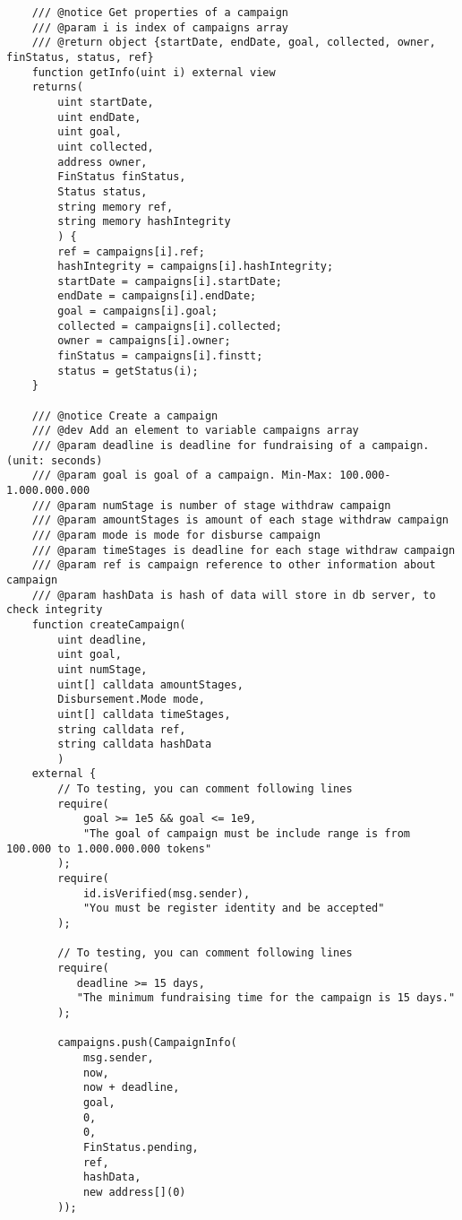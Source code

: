 \documentclass[../main-report.tex]{subfiles}
\begin{document}
\begin{lstlisting}
    /// @notice Get properties of a campaign
    /// @param i is index of campaigns array
    /// @return object {startDate, endDate, goal, collected, owner, finStatus, status, ref}
    function getInfo(uint i) external view
    returns(
        uint startDate,
        uint endDate,
        uint goal,
        uint collected,
        address owner,
        FinStatus finStatus,
        Status status,
        string memory ref,
        string memory hashIntegrity
        ) {
        ref = campaigns[i].ref;
        hashIntegrity = campaigns[i].hashIntegrity;
        startDate = campaigns[i].startDate;
        endDate = campaigns[i].endDate;
        goal = campaigns[i].goal;
        collected = campaigns[i].collected;
        owner = campaigns[i].owner;
        finStatus = campaigns[i].finstt;
        status = getStatus(i);
    }

    /// @notice Create a campaign
    /// @dev Add an element to variable campaigns array
    /// @param deadline is deadline for fundraising of a campaign. (unit: seconds)
    /// @param goal is goal of a campaign. Min-Max: 100.000-1.000.000.000
    /// @param numStage is number of stage withdraw campaign
    /// @param amountStages is amount of each stage withdraw campaign
    /// @param mode is mode for disburse campaign
    /// @param timeStages is deadline for each stage withdraw campaign
    /// @param ref is campaign reference to other information about campaign
    /// @param hashData is hash of data will store in db server, to check integrity
    function createCampaign(
        uint deadline,
        uint goal,
        uint numStage,
        uint[] calldata amountStages,
        Disbursement.Mode mode,
        uint[] calldata timeStages,
        string calldata ref,
        string calldata hashData
        )
    external {
        // To testing, you can comment following lines
        require(
            goal >= 1e5 && goal <= 1e9,
            "The goal of campaign must be include range is from 100.000 to 1.000.000.000 tokens"
        );
        require(
            id.isVerified(msg.sender),
            "You must be register identity and be accepted"
        );

        // To testing, you can comment following lines
        require(
           deadline >= 15 days,
           "The minimum fundraising time for the campaign is 15 days."
        );
        
        campaigns.push(CampaignInfo(
            msg.sender,
            now,
            now + deadline,
            goal,
            0,
            0,
            FinStatus.pending,
            ref,
            hashData,
            new address[](0)
        ));


\end{lstlisting}
\end{document}
